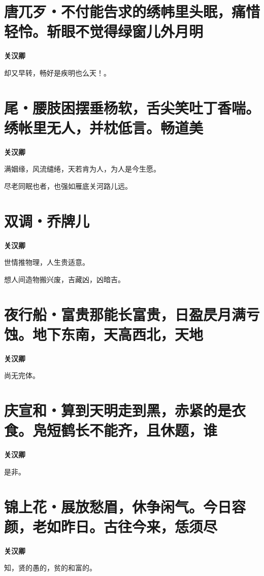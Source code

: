 \documentclass[12pt,a4paper]{ctexbook}
\begin{document}
\section{唐兀歹・不付能告求的绣帏里头眠，痛惜轻怜。斩眼不觉得绿窗儿外月明}
\textbf{关汉卿}\par\vspace{0.5em}
却又早转，畅好是疾明也么天！。\par

\section{尾・腰肢困摆垂杨软，舌尖笑吐丁香喘。绣帐里无人，并枕低言。畅道美}
\textbf{关汉卿}\par\vspace{0.5em}
满姻缘，风流缱绻，天若肯为人，为人是今生愿。\par
尽老同眠也者，也强如雁底关河路儿远。\par

\section{双调・乔牌儿}
\textbf{关汉卿}\par\vspace{0.5em}
世情推物理，人生贵适意。\par
想人间造物搬兴废，吉藏凶，凶暗吉。\par

\section{夜行船・富贵那能长富贵，日盈昃月满亏蚀。地下东南，天高西北，天地}
\textbf{关汉卿}\par\vspace{0.5em}
尚无完体。\par

\section{庆宣和・算到天明走到黑，赤紧的是衣食。凫短鹤长不能齐，且休题，谁}
\textbf{关汉卿}\par\vspace{0.5em}
是非。\par

\section{锦上花・展放愁眉，休争闲气。今日容颜，老如昨日。古往今来，恁须尽}
\textbf{关汉卿}\par\vspace{0.5em}
知，贤的愚的，贫的和富的。\par
\end{document}

